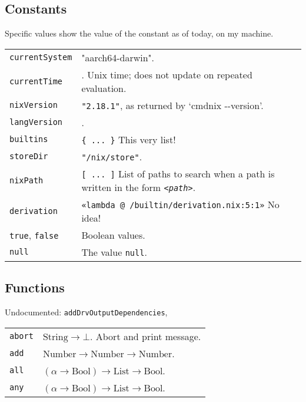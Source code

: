 \documentclass[10pt, a4paper, landscape]{article}
\newcommand{\cmd}[1]{\texttt{#1}}
\newcommand{\str}{\text{String}}
\newcommand{\num}{\text{Number}}
\newcommand{\lst}{\text{List}}
\newcommand{\bln}{\text{Bool}}
\begin{document}
\begin{multicols*}{3}
\subsection*{Constants}
Specific values show the value of the constant as of today, on my
machine.

\begin{tabularx}{\columnwidth}{@{}l>{\raggedright\arraybackslash}X@{}}
\cmd{currentSystem} & "aarch64-darwin". \\
\cmd{currentTime} & 1700936742. Unix time; does not update on repeated
evaluation. \\
\cmd{nixVersion} & \cmd{"2.18.1"}, as returned by `cmd{nix -{}-version}'. \\
\cmd{langVersion} & 6. \\
\cmd{builtins} & \cmd{\{\ ...\ \}} This very list! \\
\cmd{storeDir} & \cmd{"/nix/store"}. \\
\cmd{nixPath} & \cmd{[\ ...\ ]} List of paths to search when a path is
written in the form \cmd{<\emph{path}>}.  \\
\cmd{derivation} & \cmd{«lambda @ /builtin/derivation.nix:5:1»} No
idea! \\
\cmd{true}, \cmd{false} & Boolean values. \\
\cmd{null} & The value \cmd{null}. \\
\end{tabularx}

\subsection*{Functions}

Undocumented:
\cmd{addDrvOutputDependencies},


\begin{tabularx}{\columnwidth}{@{}l>{\raggedright\arraybackslash}X@{}}

\cmd{abort} & $\str \to \bot $. Abort and print message. \\
  
\cmd{add} &  $\num \to \num \to \num$. \\


\cmd{all} & $(\alpha \to \bln) \to \lst \to \bln$. \\

\cmd{any} & $(\alpha \to \bln) \to \lst \to \bln$.\\ 

\end{tabularx}


\end{multicols*}
\end{document}
